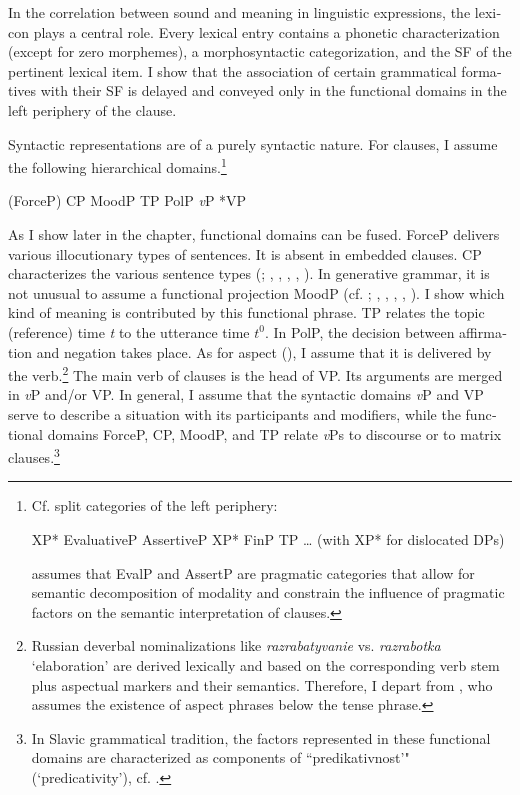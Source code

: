 \documentclass[output=paper,colorlinks,citecolor=brown]{langscibook}
\begin{document}
\begin{otherlanguage}{english}
In the correlation between sound and meaning in linguistic expressions, the lexicon plays a central role. Every lexical entry contains a phonetic characterization (except for zero morphemes), a morphosyntactic categorization, and the SF of the pertinent lexical item. I show that the association of certain grammatical formatives with their SF is delayed and conveyed only in the functional domains in the left periphery of the clause.

Syntactic representations are of a purely syntactic nature. For clauses, I assume the following hierarchical domains.\footnote{Cf.  split categories of the left periphery:

\begin{exe}
\ex XP* EvaluativeP AssertiveP XP* FinP TP … (with XP* for dislocated DPs)
\end{exe}

\noindent \textcite{Ambar2016} assumes that EvalP and AssertP are pragmatic categories that allow for semantic decomposition of modality and constrain the influence of pragmatic factors on the semantic interpretation of clauses.
} 

\begin{exe}
\ex (ForceP) CP MoodP TP PolP \textit{v}P *VP
\end{exe}

\noindent As I show later in the chapter, functional domains can be fused. ForceP delivers various illocutionary types of sentences. It is absent in embedded clauses. CP characterizes the various sentence types (\citealt{Brandt-Reis-etal1992}; \citeauthor{Zimmermann2009} \citeyear{Zimmermann2009}, \citeyear{Zimmermann2010}, \citeyear{Zimmermann2013}, \citeyear{Zimmermann2015a}, \citeyear{Zimmermann2017}). In generative grammar, it is not unusual to assume a functional projection MoodP (cf. \citealt{Lohnstein2000}; \citeauthor{Giannakidou2009} \citeyear{Giannakidou2009}, \citeyear{Giannakidou2011}, \citeyear{Giannakidou2011a}, \citeyear{Giannakidou2014}, \citeyear{Giannakidou2016}). I show which kind of meaning is contributed by this functional phrase. TP relates the topic (reference) time \textit{t} to the utterance time $t^0$. In PolP, the decision between affirmation and negation takes place. As for aspect (\citealt{Klein1994}), I assume that it is delivered by the verb.\footnote{Russian deverbal nominalizations like \textit{razrabatyvanie} vs. \textit{razrabotka} `elaboration' are derived lexically and based on the corresponding verb stem plus aspectual markers and their semantics. Therefore, I depart from \textcite{Swart2016}, who assumes the existence of aspect phrases below the tense phrase.
}
The main verb of clauses is the head of VP. Its arguments are merged in \textit{v}P and/or VP. In general, I assume that the syntactic domains \textit{v}P and VP serve to describe a situation with its participants and modifiers, while the functional domains ForceP, CP, MoodP, and TP relate \textit{v}Ps to discourse or to matrix clauses.\footnote{In Slavic grammatical tradition, the factors represented in these functional domains are characterized as components of ``predikativnost'" (`predicativity'), cf. \textcite[177ff.]{Pitsch2014}.
}


\end{otherlanguage}
\end{document}
